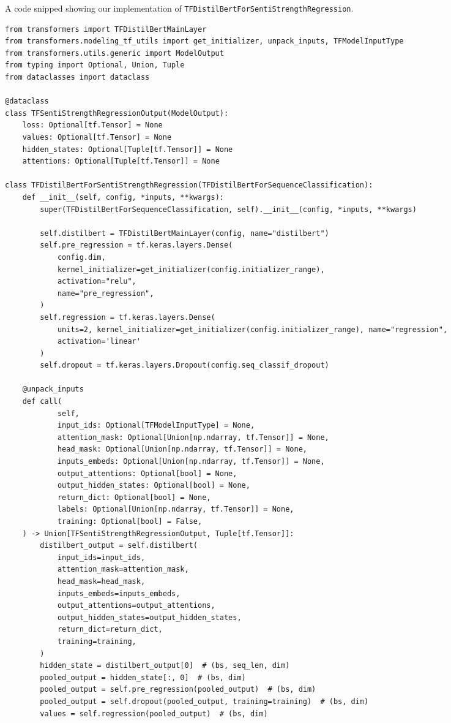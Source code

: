 \begin{listing*}
\caption{A code snipped showing our implementation of \texttt{TFDistilBertForSentiStrengthRegression}.}
\begin{verbatim}
from transformers import TFDistilBertMainLayer
from transformers.modeling_tf_utils import get_initializer, unpack_inputs, TFModelInputType
from transformers.utils.generic import ModelOutput
from typing import Optional, Union, Tuple
from dataclasses import dataclass

@dataclass
class TFSentiStrengthRegressionOutput(ModelOutput):
    loss: Optional[tf.Tensor] = None
    values: Optional[tf.Tensor] = None
    hidden_states: Optional[Tuple[tf.Tensor]] = None
    attentions: Optional[Tuple[tf.Tensor]] = None

class TFDistilBertForSentiStrengthRegression(TFDistilBertForSequenceClassification):
    def __init__(self, config, *inputs, **kwargs):
        super(TFDistilBertForSequenceClassification, self).__init__(config, *inputs, **kwargs)

        self.distilbert = TFDistilBertMainLayer(config, name="distilbert")
        self.pre_regression = tf.keras.layers.Dense(
            config.dim,
            kernel_initializer=get_initializer(config.initializer_range),
            activation="relu",
            name="pre_regression",
        )
        self.regression = tf.keras.layers.Dense(
            units=2, kernel_initializer=get_initializer(config.initializer_range), name="regression",
            activation='linear'
        )
        self.dropout = tf.keras.layers.Dropout(config.seq_classif_dropout)

    @unpack_inputs
    def call(
            self,
            input_ids: Optional[TFModelInputType] = None,
            attention_mask: Optional[Union[np.ndarray, tf.Tensor]] = None,
            head_mask: Optional[Union[np.ndarray, tf.Tensor]] = None,
            inputs_embeds: Optional[Union[np.ndarray, tf.Tensor]] = None,
            output_attentions: Optional[bool] = None,
            output_hidden_states: Optional[bool] = None,
            return_dict: Optional[bool] = None,
            labels: Optional[Union[np.ndarray, tf.Tensor]] = None,
            training: Optional[bool] = False,
    ) -> Union[TFSentiStrengthRegressionOutput, Tuple[tf.Tensor]]:
        distilbert_output = self.distilbert(
            input_ids=input_ids,
            attention_mask=attention_mask,
            head_mask=head_mask,
            inputs_embeds=inputs_embeds,
            output_attentions=output_attentions,
            output_hidden_states=output_hidden_states,
            return_dict=return_dict,
            training=training,
        )
        hidden_state = distilbert_output[0]  # (bs, seq_len, dim)
        pooled_output = hidden_state[:, 0]  # (bs, dim)
        pooled_output = self.pre_regression(pooled_output)  # (bs, dim)
        pooled_output = self.dropout(pooled_output, training=training)  # (bs, dim)
        values = self.regression(pooled_output)  # (bs, dim)


\end{verbatim}
\end{listing*}
